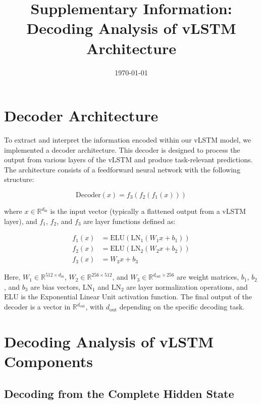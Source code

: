 \documentclass[12pt]{article}
\begin{document}
\title{Supplementary Information: Decoding Analysis of vLSTM Architecture}
\date{\today}
\maketitle

\section{Decoder Architecture}

To extract and interpret the information encoded within our vLSTM model, we implemented a decoder architecture. This decoder is designed to process the output from various layers of the vLSTM and produce task-relevant predictions. The architecture consists of a feedforward neural network with the following structure:

\begin{equation}
    \text{Decoder}(x) = f_3(f_2(f_1(x)))
\end{equation}

where $x \in \mathbb{R}^{d_\text{in}}$ is the input vector (typically a flattened output from a vLSTM layer), and $f_1$, $f_2$, and $f_3$ are layer functions defined as:

\begin{align}
    f_1(x) &= \text{ELU}(\text{LN}_1(W_1x + b_1)) \\
    f_2(x) &= \text{ELU}(\text{LN}_2(W_2x + b_2)) \\
    f_3(x) &= W_3x + b_3
\end{align}

Here, $W_1 \in \mathbb{R}^{512 \times d_\text{in}}$, $W_2 \in \mathbb{R}^{256 \times 512}$, and $W_3 \in \mathbb{R}^{d_\text{out} \times 256}$ are weight matrices, $b_1$, $b_2$, and $b_3$ are bias vectors, $\text{LN}_1$ and $\text{LN}_2$ are layer normalization operations, and $\text{ELU}$ is the Exponential Linear Unit activation function. The final output of the decoder is a vector in $\mathbb{R}^{d_\text{out}}$, with $d_\text{out}$ depending on the specific decoding task.

\section{Decoding Analysis of vLSTM Components}

\subsection{Decoding from the Complete Hidden State}
\end{document}
